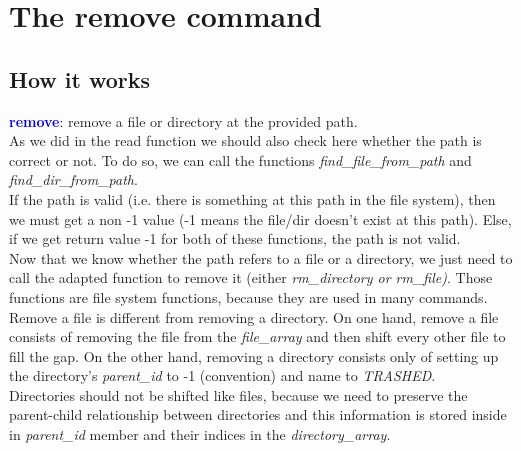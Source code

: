 \section{The remove command}

\subsection{How it works}
\textcolor{blue}{\textbf{remove}}: remove a file or directory at the provided path.\\

As we did in the read function we should also check here whether the path is correct or not. To do so, we can call the functions \textit{find\_file\_from\_path} and \textit{find\_dir\_from\_path}.\\

If the path is valid (i.e. there is something at this path in the file system), then we must get a non -1 value (-1 means the file/dir doesn't exist at this path). Else, if we get return value -1 for both of these functions, the path is not valid.\\

Now that we know whether the path refers to a file or a directory, we just need to call the adapted function to remove it (either \textit{rm\_directory or rm\_file)}. Those functions are file system functions, because they are used in many commands.\\

Remove a file is different from removing a directory.
On one hand, remove a file consists of removing the file from the \textit{file\_array} and then shift every other file to fill the gap.
On the other hand, removing a directory consists only of setting up the directory's \textit{parent\_id} to -1 (convention) and name to \textit{TRASHED}.\\

Directories should not be shifted like files, because we need to preserve the parent-child relationship between directories and this information is stored inside in \textit{parent\_id} member and their indices in the \textit{directory\_array}.\\

